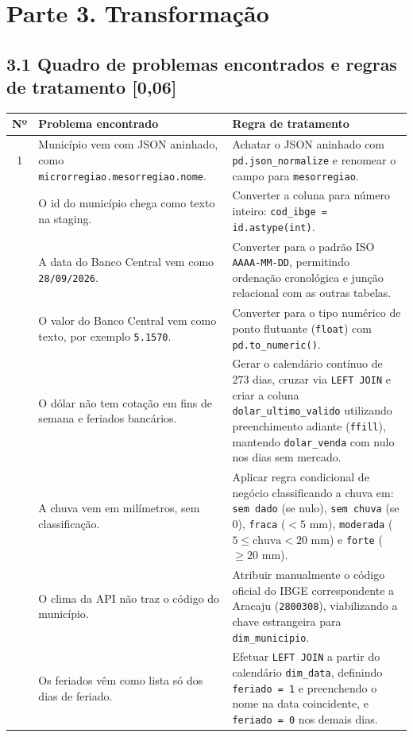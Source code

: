 \documentclass[11pt,a4paper]{article}
\begin{document}
\section*{Parte 3. Transformação}

\subsection*{3.1 Quadro de problemas encontrados e regras de tratamento \textnormal{[0,06]}}

\begin{table}[h!]
\centering
\small
\begin{tabularx}{\textwidth}{c p{5.5cm} X}
\toprule
\textbf{Nº} & \textbf{Problema encontrado} & \textbf{Regra de tratamento} \\
\midrule
1 & Município vem com JSON aninhado, como \texttt{microrregiao.mesorregiao.nome}. & Achatar o JSON aninhado com \texttt{pd.json\_normalize} e renomear o campo para \texttt{mesorregiao}. \\
\addlinespace
2 & O id do município chega como texto na staging. & Converter a coluna para número inteiro: \texttt{cod\_ibge = id.astype(int)}. \\
\addlinespace
3 & A data do Banco Central vem como \texttt{28/09/2026}. & Converter para o padrão ISO \texttt{AAAA-MM-DD}, permitindo ordenação cronológica e junção relacional com as outras tabelas. \\
\addlinespace
4 & O valor do Banco Central vem como texto, por exemplo \texttt{5.1570}. & Converter para o tipo numérico de ponto flutuante (\texttt{float}) com \texttt{pd.to\_numeric()}. \\
\addlinespace
5 & O dólar não tem cotação em fins de semana e feriados bancários. & Gerar o calendário contínuo de 273 dias, cruzar via \texttt{LEFT JOIN} e criar a coluna \texttt{dolar\_ultimo\_valido} utilizando preenchimento adiante (\texttt{ffill}), mantendo \texttt{dolar\_venda} com nulo nos dias sem mercado. \\
\addlinespace
6 & A chuva vem em milímetros, sem classificação. & Aplicar regra condicional de negócio classificando a chuva em: \texttt{sem dado} (se nulo), \texttt{sem chuva} (se 0), \texttt{fraca} ($< 5\text{ mm}$), \texttt{moderada} ($5 \le \text{chuva} < 20\text{ mm}$) e \texttt{forte} ($\ge 20\text{ mm}$). \\
\addlinespace
7 & O clima da API não traz o código do município. & Atribuir manualmente o código oficial do IBGE correspondente a Aracaju (\texttt{2800308}), viabilizando a chave estrangeira para \texttt{dim\_municipio}. \\
\addlinespace
8 & Os feriados vêm como lista só dos dias de feriado. & Efetuar \texttt{LEFT JOIN} a partir do calendário \texttt{dim\_data}, definindo \texttt{feriado = 1} e preenchendo o nome na data coincidente, e \texttt{feriado = 0} nos demais dias. \\
\bottomrule
\end{tabularx}
\end{table}
\end{document}
